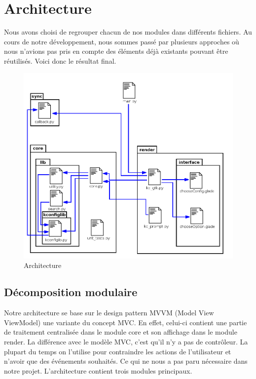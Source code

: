 \documentclass[16pts]{report}
\begin{document}

\nocite{*}

\chapter{Architecture}
\label{cha:Architecture}

Nous avons choisi de regrouper chacun de nos modules dans différents fichiers.
Au cours de notre développement, nous sommes passé par plusieurs approches
où nous n'avions pas pris en compte des éléments déjà existants pouvant être
réutilisés. Voici donc le résultat final.
\begin{figure}[H]
    \includegraphics[scale=0.5]{illustrations/archi_add_v1.png}
    \centering
    \caption{Architecture}
    \label{fig:Arch}
\end{figure}

\section{Décomposition modulaire}
\label{sec:Décomposition modulaire}
Notre architecture se base sur le design pattern MVVM (Model View
ViewModel) une variante du concept MVC. En effet, celui-ci contient une
partie de traitement centralisée dans le module core et son affichage dans
le module render.
La différence avec le modèle MVC, c'est qu'il n'y a pas de contrôleur.  La
plupart du temps on l'utilise pour contraindre les actions de l'utilisateur
et n'avoir que des événements souhaités. Ce qui ne nous a pas paru nécessaire
dans notre projet.
L'architecture contient trois modules principaux.
\end{document}
